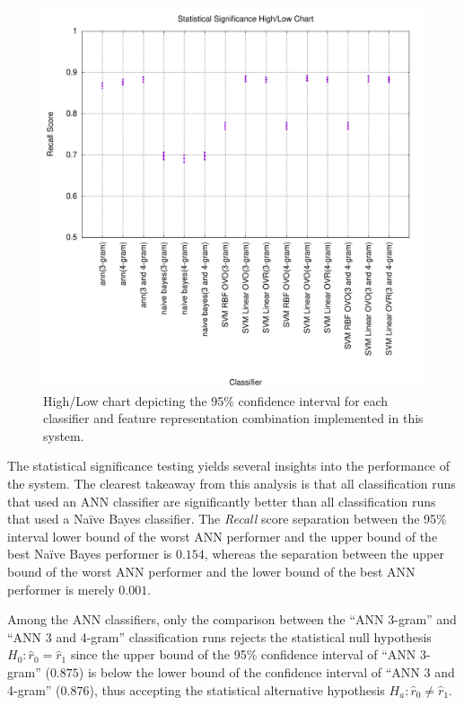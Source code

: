 \documentclass[conference]{sig-alternate-05-2015}
\begin{document}
\begin{figure}[ht!]
  \centering
  \includegraphics[width=.9\textwidth]{statsig_highlow.pdf}
  \caption{High/Low chart depicting the 95\% confidence interval for each
  classifier and feature representation combination implemented in this system.}
  \label{fig:stat_sig_highlow}
\end{figure}

The statistical significance testing yields several insights into the
performance of the system. The clearest takeaway from this analysis is that all
classification runs that used an ANN classifier are significantly better than
all classification runs that used a Na\"ive Bayes classifier. The 
\textit{Recall} score separation between the 95\% interval lower bound of the
worst ANN performer and the upper bound of the best Na\"ive Bayes performer is
$0.154$, whereas the separation between the upper bound of the worst
ANN performer and the lower bound of the best ANN performer is merely $0.001$.
\par

Among the ANN classifiers, only the comparison between the ``ANN 3-gram'' and
``ANN 3 and 4-gram'' classification runs rejects the statistical null hypothesis
$H_0: \hat{r}_0 = \hat{r}_1$ since the upper bound of the 95\% confidence
interval of ``ANN 3-gram'' ($0.875$) is below the lower bound of the confidence
interval of ``ANN 3 and 4-gram'' ($0.876$), thus accepting the statistical
alternative hypothesis $H_a: \hat{r}_0 \neq \hat{r}_1$.\par
\end{document}
